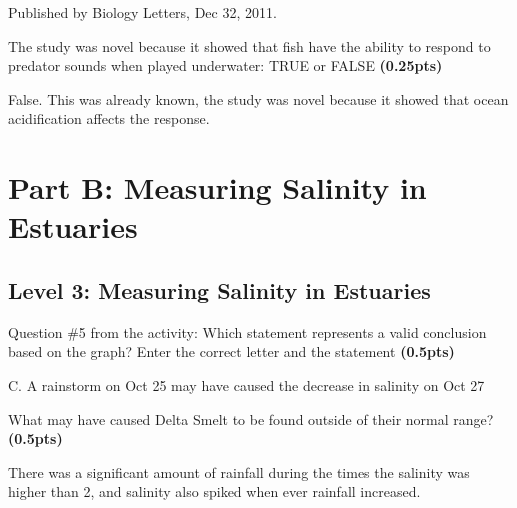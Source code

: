 \documentclass[12pt,letterpaper]{article}
\begin{document}
\begin{enumerate}[font=\bfseries, wide]
\begin{enumerate}
        Published by Biology Letters, Dec 32, 2011.

        {\color{under}\item The study was novel because it showed that fish have the ability to respond to predator sounds when played underwater:  TRUE or FALSE \textbf{(0.25pts)}}

        False. This was already known, the study was novel because it showed that ocean acidification affects the response. 
    \end{enumerate}
\end{enumerate}

\section*{Part B: Measuring Salinity in Estuaries}
\subsection*{Level 3: Measuring Salinity in Estuaries}
\begin{enumerate}[font=\bfseries, wide, resume]
    {\color{under}\item Question \#5 from the activity: Which statement represents a valid conclusion based on the graph?  Enter the correct letter and the statement \textbf{(0.5pts)}}

    C. A rainstorm on Oct 25 may have caused the decrease in salinity on Oct 27

    {\color{under}\item What may have caused Delta Smelt to be found outside of their normal range? \textbf{(0.5pts)} }

    There was a significant amount of rainfall during the times the salinity was higher than 2, and salinity also spiked when ever rainfall increased. 
\end{enumerate}
\end{document}
